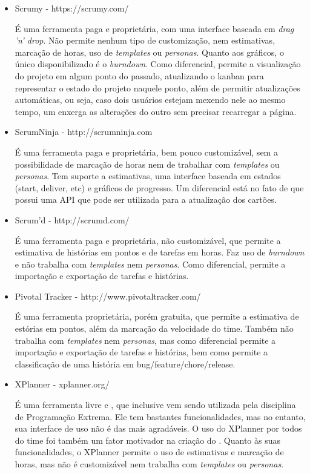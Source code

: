 \begin{itemize}
\item{Scrumy - https://scrumy.com/

É uma ferramenta paga e proprietária, com uma interface baseada em \textit{drag 'n' drop}. Não permite nenhum tipo de
customização, nem estimativas, marcação de horas, uso de \textit{templates} ou \textit{personas}. Quanto aos gráficos, o único disponibilizado
é o \textit{burndown}. Como diferencial, permite a visualização do
projeto em algum ponto do passado, atualizando o kanban para representar o estado do projeto naquele ponto, além de
permitir atualizações automáticas, ou seja, caso dois usuários estejam mexendo nele ao mesmo tempo, um enxerga as alterações
do outro sem precisar recarregar a página.}

\item{ScrumNinja - http://scrumninja.com

É uma ferramenta paga e proprietária, bem pouco customizável, sem a possibilidade de marcação de horas nem de
trabalhar com \textit{templates} ou \textit{personas}. Tem suporte a estimativas, uma interface baseada em estados (start, deliver, etc) e
gráficos de progresso. Um diferencial está no fato de que possui uma API que pode ser utilizada para a atualização dos cartões.}

\item{Scrum'd - http://scrumd.com/

É uma ferramenta paga e proprietária, não customizável, que permite a estimativa de histórias em pontos e de tarefas
em horas. Faz uso de \textit{burndown} e não trabalha com \textit{templates} nem \textit{personas}. Como diferencial, permite a importação e exportação de tarefas e histórias.}

\item{Pivotal Tracker - http://www.pivotaltracker.com/

É uma ferramenta proprietária, porém gratuita, que permite a estimativa de estórias em pontos, além da marcação da velocidade do time. Também não trabalha com \textit{templates} nem \textit{personas}, mas como diferencial permite a importação e exportação de tarefas e histórias, bem como permite a classificação de uma história em bug/feature/chore/release.}

\item{XPlanner - xplanner.org/

É uma ferramenta livre e \opensource{}, que inclusive vem sendo utilizada pela disciplina de Programação Extrema.
Ele tem bastantes funcionalidades, mas no entanto, sua interface de uso não é das mais agradáveis. O uso do XPlanner
por todos do time foi também um fator motivador na criação do \calopsita{}. Quanto às suas funcionalidades, o XPlanner
permite o uso de estimativas e marcação de horas, mas não é customizável nem trabalha com \textit{templates} ou \textit{personas}.}


\end{itemize}
